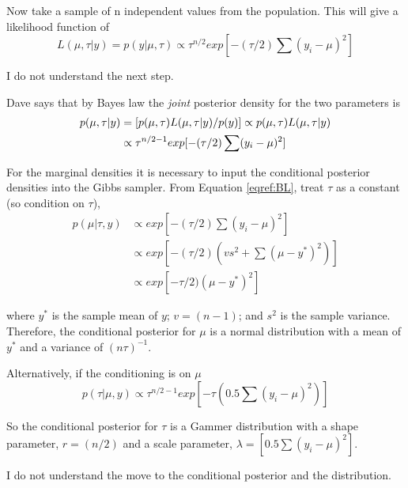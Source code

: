 \documentclass[12pt, a4paper, oneside]{article} %
\begin{document}
Now take a sample of n independent values from the population.  This will give a likelihood function of
\begin{equation}
L(\mu, \tau | y) = p(y | \mu, \tau) \propto \tau^{n/2} exp[-(\tau/2) \sum(y_i - \mu)^2]
\end{equation}

I do not understand the next step.  

Dave says that by Bayes law the \emph{joint} posterior density for the two parameters is
\begin{align}{\label{eqref:BL}}
p(\mu, \tau | y) &= [p(\mu, \tau)L(\mu, \tau | y)/ p(y)] \propto p(\mu, \tau)L(\mu, \tau |y)\\
                 &\propto \tau^{n/2 -1}exp[-(\tau/2)\sum(y_i - \mu)^2]
\end{align}

For the marginal densities it is necessary to input the conditional posterior densities into the Gibbs sampler.  
From Equation \ref{eqref:BL}, treat $\tau$ as a constant (so condition on $\tau$), 
\begin{align}
p(\mu | \tau, y) &\propto exp[-(\tau/2)\sum(y_i - \mu)^2]\\
&\propto exp[-(\tau/2) (vs^2 + \sum(\mu - y^*)^2)]\\
&\propto exp[-\tau/2)(\mu - y^*)^2]
\end{align}

where $y^*$ is the sample mean of $y$; $v = (n - 1)$; and $s^2$ is the sample variance. Therefore, the conditional posterior for $\mu$ is a normal distribution with a mean of $y^*$ and a variance of $(n\tau)^{-1}$.

Alternatively, if the conditioning is on $\mu$ 
\begin{equation}
p(\tau | \mu, y) \propto \tau^{n/2 -1}exp[-\tau(0.5\sum(y_i - \mu)^2)]
\end{equation}

So the conditional posterior for $\tau$ is a Gammer distribution with a shape parameter, $r = (n/2)$ and a scale parameter, $\lambda = [0.5\sum(y_i - \mu)^2]$. 

I do not understand the move to the conditional posterior and the distribution. 
\end{document}
